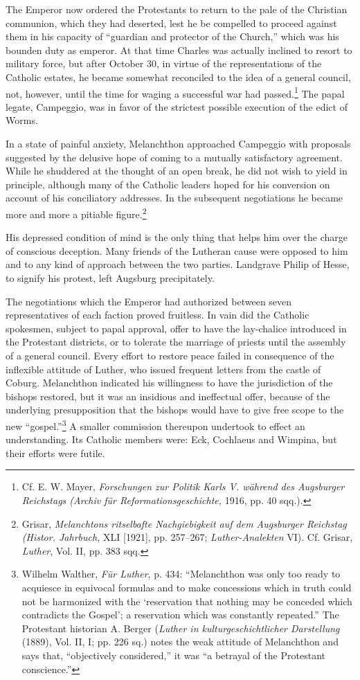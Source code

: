 The Emperor now ordered the Protestants to return to the pale of
the Christian communion, which they had deserted, lest he be compelled
to proceed against them in his capacity of “guardian and protector of
the Church,” which was his bounden duty as emperor. At
that time Charles was actually inclined to resort to military force,
but after October 30, in virtue of the representations of the Catholic
estates, he became somewhat reconciled to the idea of a general
council, not, however, until the time for waging a successful war had
passed.\footnote
{Cf. E. W. Mayer, \textit{Forschungen zur Politik Karls V. während des Augsburger Reichstags (Archiv für Reformationsgeschichte,} 1916, pp. 40 sqq.).}
The papal legate, Campeggio, was in favor of the strictest possible
execution of the edict of Worms.

In a state of painful anxiety, Melanchthon approached Campeggio
with proposals suggested by the delusive hope of coming to a mutually
satisfactory agreement. While he shuddered at the thought of an open
break, he did not wish to yield in principle, although many of the
Catholic leaders hoped for his conversion on account of his conciliatory
addresses. In the subsequent negotiations he became more and
more a pitiable figure.\footnote
{Grisar, \textit{Melanchtons ritselbafte Nachgiebigkeit auf dem Augsburger Reichstag (Histor.
Jahrbuch,} XLI [1921], pp. 257--267; \textit{Luther-Analekten} VI). Cf. Grisar, \textit{Luther}, Vol. II,
pp. 383 sqq.}

His depressed condition of mind is the only
thing that helps him over the charge of conscious deception. Many
friends of the Lutheran cause were opposed to him and to any kind of
approach between the two parties. Landgrave Philip of Hesse, to
signify his protest, left Augsburg precipitately.

The negotiations which the Emperor had authorized between seven
representatives of each faction proved fruitless. In vain did the
Catholic spokesmen, subject to papal approval, offer to have the lay-chalice
introduced in the Protestant districts, or to tolerate the marriage of
priests until the assembly of a general council. Every effort to
restore peace failed in consequence of the inflexible attitude of Luther,
who issued frequent letters from the castle of Coburg. Melanchthon
indicated his willingness to have the jurisdiction of the bishops restored,
but it was an insidious and ineffectual offer, because of the
underlying presupposition that the bishops would have to give free
scope to the new “gospel.”\footnote
{Wilhelm Walther, \textit{Für Luther}, p. 434: “Melanchthon was only too ready to acquiesce
in equivocal formulas and to make concessions which in truth could not be harmonized
with the ‘reservation that nothing may be conceded which contradicts the Gospel’; a reservation
which was constantly repeated.” The Protestant historian A. Berger (\textit{Luther
in kulturgeschichtlicher Darstellung} (1889), Vol. II, I; pp. 226 sq.) notes the weak attitude
of Melanchthon and says that, “objectively considered,” it was “a betrayal of the
Protestant conscience.”}
A smaller commission thereupon undertook
to effect an understanding. Its Catholic members were: Eck,
Cochlaeus and Wimpina, but their efforts were futile.

